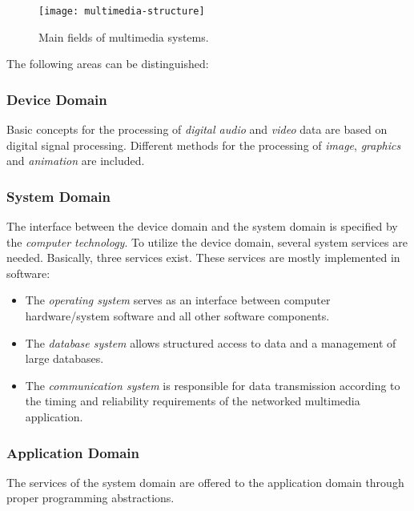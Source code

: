 		
\begin{figure}[H]
	\centering
	\texttt{[image: multimedia-structure]}
	\caption{Main fields of multimedia systems.}\label{fig:multimedia-structure}
\end{figure}

\noindent The following areas can be distinguished:

\subsubsection*{Device Domain}
	Basic concepts for the processing of \textit{digital audio} and \textit{video} data are based
	on digital signal processing. Different methods for the	processing of \textit{image}, \textit{graphics} and \textit{animation} are included.
	
\subsubsection*{System Domain}
	The interface between the device domain and the system domain is specified
	by the \textit{computer technology}. To utilize the device domain, several system services are needed. Basically, three services exist. These services are mostly implemented in software:
		\begin{itemize}
			\item The \textit{operating system} serves as an interface between computer hardware/system software and all other software components.
			
			\item The \textit{database system }allows structured access to data and a management of large databases.
			
			\item The \textit{communication system} is responsible for data transmission according to the timing and reliability requirements of the networked multimedia application.
		\end{itemize}
	
	
\subsubsection*{Application Domain}
	
	The services of the system domain are offered to the application domain through proper programming abstractions.
	
